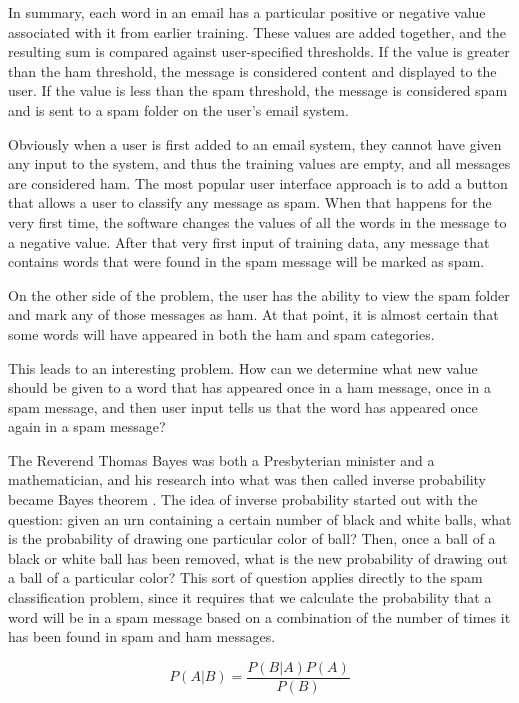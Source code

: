 \documentclass[12pt]{article}
\begin{document}
In summary, each word in an email has a particular positive or negative value associated with it from earlier
training. These values are added together, and the resulting sum is compared against user-specified
thresholds. If the value is greater than the ham threshold, the message is considered content and displayed to
the user. If the value is less than the spam threshold, the message is considered spam and is sent to a spam
folder on the user's email system.

Obviously when a user is first added to an email system, they cannot have given any input to the system, and
thus the training values are empty, and all messages are considered ham. The most popular user interface
approach is to add a button that allows a user to classify any message as spam. When that happens for the very
first time, the software changes the values of all the words in the message to a negative value. After that
very first input of training data, any message that contains words that were found in the spam message will be
marked as spam.

On the other side of the problem, the user has the ability to view the spam folder and mark any of those
messages as ham. At that point, it is almost certain that some words will have appeared in both the ham and
spam categories.

This leads to an interesting problem. How can we determine what new value should be given to a word that has
appeared once in a ham message, once in a spam message, and then user input tells us that the word has
appeared once again in a spam message?

The Reverend Thomas Bayes was both a Presbyterian minister and a mathematician, and his research into what was
then called inverse probability became Bayes theorem \citep{barnard1958studies}. The idea of inverse
probability started out with the question: given an urn containing a certain number of black and white balls,
what is the probability of drawing one particular color of ball? Then, once a ball of a black or white ball
has been removed, what is the new probability of drawing out a ball of a particular color? This sort of
question applies directly to the spam classification problem, since it requires that we calculate the
probability that a word will be in a spam message based on a combination of the number of times it has been
found in spam and ham messages.

$$P(A|B)= \dfrac{P(B|A)P(A)}{P(B)}$$
\end{document}
